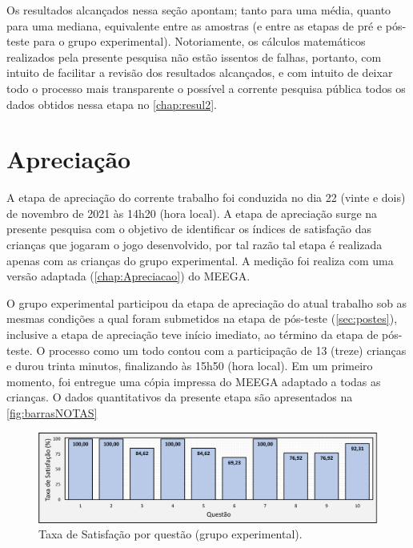 Os resultados alcançados nessa seção apontam; tanto para uma média, quanto para uma mediana, equivalente entre as amostras (e entre as etapas de pré e pós-teste para o grupo experimental). Notoriamente, os cálculos matemáticos realizados pela presente pesquisa não estão issentos de falhas, portanto, com intuito de facilitar a revisão dos resultados alcançados, e com intuito de deixar todo o processo mais transparente o possível a corrente pesquisa pública todos os dados obtidos nessa etapa no \autoref{chap:resul2}.


\section{Apreciação}\label{sec:apreciar}

A etapa de apreciação do corrente trabalho foi conduzida no dia 22 (vinte e dois) de novembro de 2021 às 14h20 (hora local). A etapa de apreciação surge na presente pesquisa com o objetivo de identificar os índices de satisfação das crianças que jogaram o jogo desenvolvido, por tal razão tal etapa é realizada apenas com as crianças do grupo experimental. A medição foi realiza com uma versão adaptada (\autoref{chap:Apreciacao}) do \acf{MEEGA}.

O grupo experimental participou da etapa de apreciação do atual trabalho sob as mesmas condições a qual foram submetidos na etapa de pós-teste (\autoref{sec:postes}), inclusive a etapa de apreciação teve início imediato, ao término da etapa de pós-teste. O processo como um todo contou com a participação de 13 (treze) crianças e durou trinta minutos, finalizando às 15h50 (hora local). Em um primeiro momento, foi entregue uma cópia impressa do \ac{MEEGA} adaptado a todas as crianças. O dados quantitativos da presente etapa são apresentados na \autoref{fig:barrasNOTAS}

\begin{figure}[htb]
    \caption{\label{fig:barrasNOTAS}Taxa de Satisfação por questão (grupo experimental).}
    \includegraphics[width=\linewidth]{./Visuais/NotasTaxa.pdf}
\end{figure}

